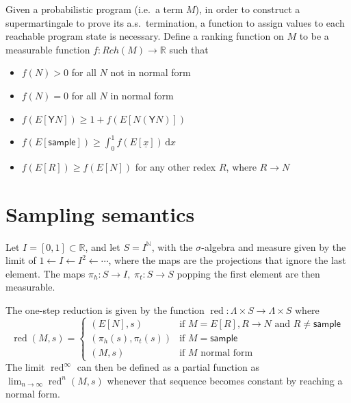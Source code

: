\documentclass{article}
\newcommand{\Y}{\textsf{Y}}
\newcommand{\sample}{\textsf{sample}}
\DeclareMathOperator{\red}{red}
\begin{document}
Given a probabilistic program (i.e.~a term $M$), in order to construct a supermartingale to prove its a.s.~termination, 
a function to assign values to each reachable program state is necessary. Define a ranking function on $M$ to be a measurable function $f:Rch(M) \to \mathbb{R}$ such that
\begin{itemize}
    \item $f(N) > 0$ for all $N$ not in normal form
    \item $f(N) = 0$ for all $N$ in normal form
    \item $f(E[\Y N]) \geq 1 + f(E[N(\Y N)])$
    \item $f(E[\sample]) \geq \int_0^1 f(E[\underline{x}]) \, \mathrm{d}x$
    \item $f(E[R]) \geq f(E[N])$ for any other redex $R$, where $R \to N$
\end{itemize}

\section{Sampling semantics}
Let $ I = [0,1] \subset \mathbb{R} $, and let $S = I^{\mathbb{N}}$, with the $\sigma$-algebra and measure given by the limit of $1 \gets I \gets I^2 \gets \cdots$, where the maps are the projections that ignore the last element. 
The maps $\pi_h:S \to I, \; \pi_t:S \to S$ popping the first element are then measurable.


The one-step reduction is given by the function $\red : \Lambda \times S \to \Lambda \times S$ where
\begin{equation}
\red(M,s) = \left\{
    \begin{array}{ll}
        (E[N],s) & \text{if } M = E[R], R \to N \text{ and } R \neq \sample \\
        (\pi_h(s),\pi_t(s)) & \text{if } M =  \sample \\
        (M,s) & \text{if } M \text{ normal form}
    \end{array} \right .
\end{equation}
The limit $\red^\infty$ can then be defined as a partial function as $\lim_{n \to \infty} \red^n(M,s)$ whenever that sequence becomes constant by reaching a normal form.
\end{document}
